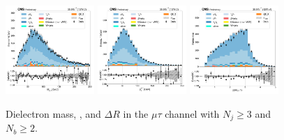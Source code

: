 \begin{figure}[htb!]
    \centering
    \includegraphics[width=0.3\textwidth]{chapters/Appendix/sectionPlots/figures/data_mc_overlays/mutau_2016_cat_gt3_gt2_signal_linear_lepton_dilepton1_mass}
    \includegraphics[width=0.3\textwidth]{chapters/Appendix/sectionPlots/figures/data_mc_overlays/mutau_2016_cat_gt3_gt2_signal_linear_lepton_dilepton1_pt}
    \includegraphics[width=0.3\textwidth]{chapters/Appendix/sectionPlots/figures/data_mc_overlays/mutau_2016_cat_gt3_gt2_signal_linear_lepton_dilepton1_delta_r}
    \caption{Dielectron mass, \pt, and $\Delta R$ in the $\mu\tau$ channel
    with $N_{j} \geq 3$ and $N_{b} \geq 2$.}
    \label{fig:mutau_8_dilepton}
\end{figure}


